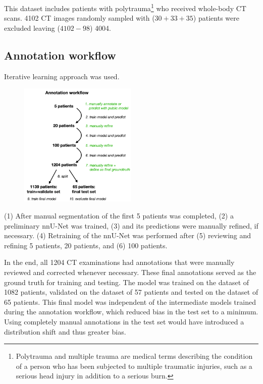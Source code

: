 \documentclass[11pt]{article}
\begin{document}
This dataset includes patients with polytrauma\footnote{Polytrauma and multiple trauma are medical terms describing the condition of a person who has been subjected to multiple traumatic injuries, such as a serious head injury in addition to a serious burn.} who received whole-body CT scans. 4102 CT images randomly sampled with ($30+33+35$) patients were excluded leaving ($4102-98$) 4004.

\subsection{Annotation workflow}

Iterative learning approach was used.

\begin{figure}
    \centering
    \includegraphics*[width=0.5\textwidth]{images/AnnotationWorkflow.png}
\end{figure}

(1) After manual segmentation of the first 5 patients was completed, (2) a preliminary nnU-Net was trained, (3) and its predictions were manually refined, if necessary. (4) Retraining of the nnU-Net was performed after (5) reviewing and refining 5 patients, 20 patients, and (6) 100 patients.

In the end, all 1204 CT examinations had annotations that were manually reviewed and corrected whenever necessary. These final annotations served as the ground truth for training and testing. The model was trained on the dataset of 1082 patients, validated on the dataset of 57 patients and tested on the dataset of 65 patients. This final model was independent of the intermediate models trained during the annotation workflow, which reduced bias in the test set to a minimum. Using completely manual annotations in the test set would have introduced a distribution shift and thus greater bias.
\end{document}
